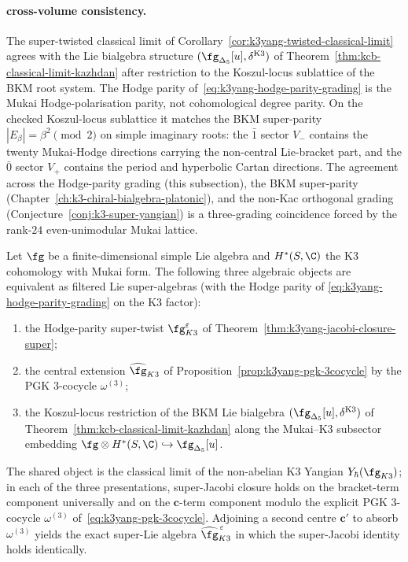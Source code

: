 \paragraph{cross-volume consistency.}
The super-twisted classical limit of
Corollary~\ref{cor:k3yang-twisted-classical-limit} agrees with the
Lie bialgebra structure
$(\fg_{\Delta_5}[u], \delta^{\mathrm{K3}})$ of
Theorem~\ref{thm:kcb-classical-limit-kazhdan} after restriction to
the Koszul-locus sublattice of the BKM root system. The Hodge
parity of~\eqref{eq:k3yang-hodge-parity-grading} is the Mukai
Hodge-polarisation parity, not cohomological degree parity. On the
checked Koszul-locus sublattice it matches the BKM super-parity
$|E_\beta| = \beta^2 \pmod 2$ on simple imaginary roots: the
$\bar 1$ sector $V_-$ contains the twenty Mukai-Hodge directions carrying
the non-central Lie-bracket part, and the $\bar 0$ sector $V_+$ contains
the period and hyperbolic Cartan directions. The
agreement across the Hodge-parity grading (this subsection), the
BKM super-parity (Chapter~\ref{ch:k3-chiral-bialgebra-platonic}),
and the non-Kac orthogonal grading
(Conjecture~\ref{conj:k3-super-yangian}) is a three-grading
coincidence forced by the rank-$24$ even-unimodular Mukai lattice.

\begin{theorem}
\label{thm:k3yang-nonabelian-classification}
Let $\fg$ be a finite-dimensional simple Lie algebra and
$H^*(S, \C)$ the K3 cohomology with Mukai form.
The following three algebraic objects are equivalent as filtered
Lie super-algebras (with the Hodge parity of
\eqref{eq:k3yang-hodge-parity-grading} on the K3 factor):
\begin{enumerate}[label=\textup{(\roman*)}]
\item the Hodge-parity super-twist $\fg^{\varepsilon}_{K3}$ of
 Theorem~\ref{thm:k3yang-jacobi-closure-super};
\item the central extension $\widehat{\fg}_{K3}$ of
 Proposition~\ref{prop:k3yang-pgk-3cocycle} by the PGK
 $3$-cocycle $\omega^{(3)}$;
\item the Koszul-locus restriction of the BKM Lie bialgebra
 $(\fg_{\Delta_5}[u], \delta^{\mathrm{K3}})$ of
 Theorem~\ref{thm:kcb-classical-limit-kazhdan} along the
 Mukai--K3 subsector embedding
 $\fg \otimes H^*(S, \C) \hookrightarrow \fg_{\Delta_5}[u]$.
\end{enumerate}
The shared object is the classical limit of the non-abelian K3
Yangian $Y_\hbar(\fg_{K3})$; in each of the three presentations,
super-Jacobi closure holds on the bracket-term component
universally and on the $\mathbf c$-term component modulo the
explicit PGK $3$-cocycle $\omega^{(3)}$
of~\eqref{eq:k3yang-pgk-3cocycle}. Adjoining a second centre
$\mathbf c'$ to absorb $\omega^{(3)}$ yields the exact super-Lie
algebra $\widehat{\fg}_{K3}^{\,\varepsilon}$ in which the
super-Jacobi identity holds identically.
\end{theorem}

